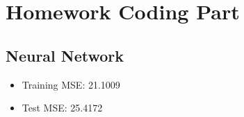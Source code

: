\documentclass[12pt]{article}
\begin{document}
% 
\setcounter{section}{5}
\section{Homework Coding Part}
\subsection{Neural Network}
\begin{itemize}
    \item Training MSE: 21.1009
    \item Test MSE: 25.4172
\end{itemize}
\inputminted[frame=single,framesep=10pt,linenos,xleftmargin=\parindent]{octave}{./hw6/nn.m}
\end{document}
